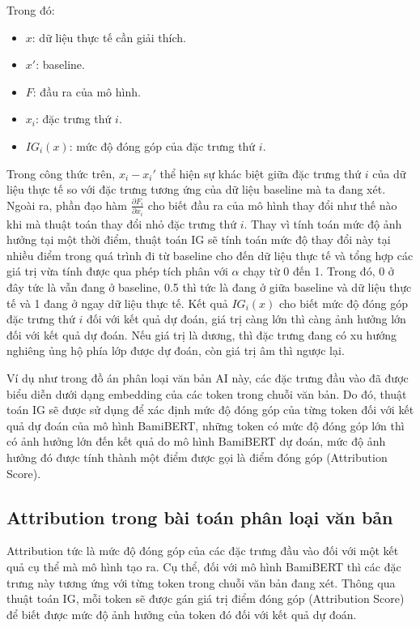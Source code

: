 \vspace{-0.3cm}
\noindent
Trong đó:
\begin{itemize}
    \item $x$: dữ liệu thực tế cần giải thích.
    \item $x'$: baseline.
    \item $F$: đầu ra của mô hình.
    \item $x_i$: đặc trưng thứ $i$.
    \item $IG_i(x)$: mức độ đóng góp của đặc trưng thứ $i$.
\end{itemize}

\noindent
Trong công thức trên, \(x_i - x_i'\) thể hiện sự khác biệt giữa đặc trưng thứ \(i\) của dữ liệu thực tế so với đặc trưng tương ứng của dữ liệu baseline mà ta đang xét. Ngoài ra, phần đạo hàm  \(\frac{\partial F_i}{\partial x_i}\) cho biết đầu ra của mô hình thay đổi như thế nào khi mà thuật toán thay đổi nhỏ đặc trưng thứ \(i\). Thay vì 
tính toán mức độ ảnh hưởng tại một thời điểm, thuật toán IG sẽ tính toán mức độ thay đổi này tại nhiều điểm trong quá trình đi từ baseline cho đến dữ liệu thực tế và tổng hợp các giá trị vừa tính được qua phép tích phân với $\alpha$ chạy từ 0 đến 1. Trong đó, 0 ở đây tức là vẫn đang ở baseline, 0.5 thì tức là đang ở giữa baseline và dữ liệu thực tế và 1 
đang ở ngay dữ liệu thực tế. Kết quả \(IG_i(x)\) cho biết mức độ đóng góp đặc trưng thứ \(i\) đối với kết quả dự đoán, giá trị càng lớn thì càng ảnh hưởng lớn đối với kết quả dự đoán. Nếu giá trị là dương, thì đặc trưng đang có xu hướng nghiêng ủng hộ phía lớp được dự đoán, còn giá trị âm thì ngược lại.

\vspace{\baselineskip}
\noindent
Ví dụ như trong đồ án phân loại văn bản AI này, các đặc trưng đầu vào đã được biểu diễn dưới dạng embedding của các token trong chuỗi văn bản. Do đó, thuật toán IG sẽ được sử dụng để xác định mức độ đóng góp của từng token đối với kết quả dự đoán của mô hình BamiBERT, những token có mức độ đóng góp lớn thì có ảnh hưởng lớn đến kết quả do mô hình BamiBERT dự đoán,
mức độ ảnh hưởng đó được tính thành một điểm được gọi là điểm đóng góp (Attribution Score).

\subsection{Attribution trong bài toán phân loại văn bản}
Attribution tức là mức độ đóng góp của các đặc trưng đầu vào đối với một kết quả cụ thể mà mô hình tạo ra. Cụ thể, đối với mô hình BamiBERT thì các đặc trưng này tương ứng với từng token trong chuỗi văn bản đang xét. Thông qua thuật toán IG, mỗi token sẽ được gán giá trị điểm đóng góp (Attribution Score) để biết được mức độ ảnh hưởng của token đó đối với kết quả dự đoán.

